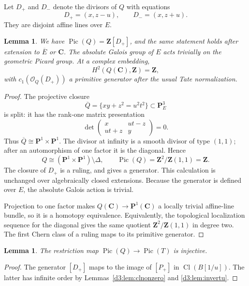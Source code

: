 \documentclass[11pt,a4paper]{amsart}
\numberwithin{equation}{section}
\newtheorem{lemma}[theorem]{Lemma}
\theoremstyle{definition}
\theoremstyle{remark}
\newcommand{\Z}{\mathbf Z}
\newcommand{\C}{\mathbf C}
\newcommand{\PP}{\mathbf P}
\newcommand{\OO}{\mathcal O}
\newcommand{\Pic}{\operatorname{Pic}}
\newcommand{\Cl}{\operatorname{Cl}}
\begin{document}
Let $D_+$ and $D_-$ denote the divisors of $Q$ with equations
\[
D_+=(x,z-u),\qquad D_-=(x,z+u).
\]
They are disjoint affine lines over $E$.

\begin{lemma}\label{d3:lem:quadricpic}
We have $\Pic(Q)=\Z[D_+]$, and the same statement holds after extension to $\overline E$ or $\C$. The absolute Galois group of $E$ acts trivially on the geometric Picard group. At a complex embedding,
\[
H^2(Q(\C),\Z)=\Z,
\]
with $c_1(\OO_Q(D_+))$ a primitive generator after the usual Tate normalization.
\end{lemma}
\begin{proof}
The projective closure
\[
\overline Q=\{xy+z^2=u^2t^2\}\subset\PP^3_E
\]
is split: it has the rank-one matrix presentation
\[
\det\begin{pmatrix}x&ut-z\\ut+z&y\end{pmatrix}=0.
\]
Thus $\overline Q\cong\PP^1\times\PP^1$. The divisor at infinity is a smooth divisor of type $(1,1)$; after an automorphism of one factor it is the diagonal. Hence
\[
Q\cong (\PP^1\times\PP^1)\setminus\Delta,
\qquad
\Pic(Q)=\Z^2/\Z(1,1)=\Z.
\]
The closure of $D_+$ is a ruling, and gives a generator. This calculation is unchanged over algebraically closed extensions. Because the generator is defined over $E$, the absolute Galois action is trivial.

Projection to one factor makes $Q(\C)\to\PP^1(\C)$ a locally trivial affine-line bundle, so it is a homotopy equivalence. Equivalently, the topological localization sequence for the diagonal gives the same quotient $\Z^2/\Z(1,1)$ in degree two. The first Chern class of a ruling maps to its primitive generator.
\end{proof}

\begin{lemma}\label{d3:lem:Picinject}
The restriction map $\Pic(Q)\to\Pic(T)$ is injective.
\end{lemma}
\begin{proof}
The generator $[D_+]$ maps to the image of $[P_+]$ in $\Cl(B[1/u])$. The latter has infinite order by Lemmas~\ref{d3:lem:clnonzero} and \ref{d3:lem:invertu}.
\end{proof}
\end{document}
